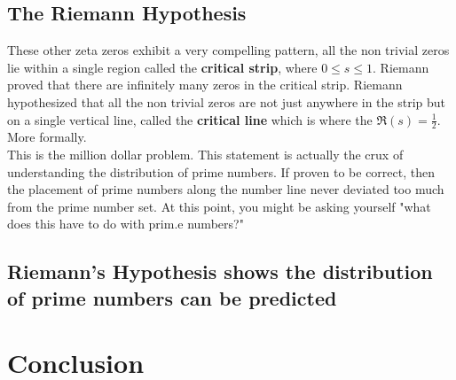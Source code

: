 \documentclass[12pt]{amsart} %
\theoremstyle{definition}
\theoremstyle{remark}
\numberwithin{equation}{section}
\begin{document}
\subsection{The Riemann Hypothesis}  These other zeta zeros exhibit a very compelling pattern, all the non trivial zeros lie within a single region called the \textbf{critical strip}, where $0\le s \le 1 $. Riemann proved that there are infinitely many zeros in the critical strip. Riemann hypothesized that all the non trivial zeros are not just anywhere in the strip but on a single vertical line, called the \textbf{critical line} which is where the $\Re(s) = \frac{1}{2}$. More formally.
\newline
\\
\noindent{}
\newline
This is the million dollar problem. This statement is actually the crux of understanding the distribution of prime numbers. If proven to be correct, then the placement of prime numbers along the number line never deviated too much from the prime number set. At this point, you might be asking yourself "what does this have to do with prim.e numbers?"

\subsection{Riemann's Hypothesis shows the distribution of prime numbers can be predicted}



\section{Conclusion}



\end{document}
